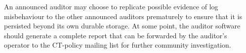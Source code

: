An announced auditor may choose to replicate possible evidence of log
misbehaviour to the other announced auditors prematurely to ensure that
it is persisted beyond its own durable storage.  At some point, the auditor
software should generate a complete report that can be forwarded by the
auditor's operator to the CT-policy mailing list for further community
investigation.
